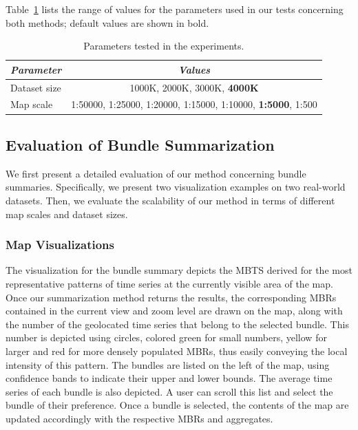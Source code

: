 Table~\ref{tab:parameters1} lists the range of values for the parameters used in our tests concerning both methods; default values are shown in bold.

\begin{table}[ht]
\centering
\caption{Parameters tested in the experiments.}
\begin{footnotesize}
\begin{tabular}{lc} 
\hline
{\em Parameter} &{\em Values} \\
\hline
Dataset size & 1000K, 2000K, 3000K, {\bf 4000K} \\
Map scale & 1:50000, 1:25000, 1:20000, 1:15000, 1:10000, {\bf 1:5000}, 1:500 \\
\hline
\end{tabular}
\end{footnotesize}
\label{tab:parameters1}
\end{table}

\subsection{Evaluation of Bundle Summarization}
\label{subsec:bundle_sum}

We first present a detailed evaluation of our method concerning bundle summaries. Specifically, we present two visualization examples on two real-world datasets. Then, we evaluate the scalability of our method in terms of different map scales and dataset sizes.

\subsubsection{Map Visualizations}
\label{subsubsec:bundle_sum_vis}

The visualization for the bundle summary depicts the MBTS derived for the most representative patterns of time series at the currently visible area of the map. Once our summarization method returns the results, the corresponding MBRs contained in the current view and zoom level are drawn on the map, along with the number of the geolocated time series that belong to the selected bundle. This number is depicted using circles, colored green for small numbers, yellow for larger and red for more densely populated MBRs, thus easily conveying the local intensity of this pattern. The bundles are listed on the left of the map, using confidence bands to indicate their upper and lower bounds. The average time series of each bundle is also depicted. A user can scroll this list and select the bundle of their preference. Once a bundle is selected, the contents of the map are updated accordingly with the respective MBRs and aggregates.

